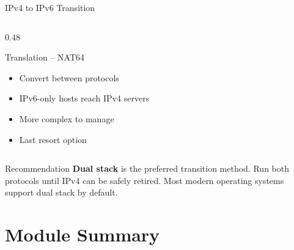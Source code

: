 \documentclass[aspectratio=169]{beamer}  %
\begin{document}
\begin{frame}[t,shrink=20]{IPv4 to IPv6 Transition}
\begin{columns}[T]
\begin{column}{0.48\textwidth}
            \vspace{0.2em}
            \begin{block}{Translation -- NAT64}
                \begin{itemize}
                    \scriptsize
                    \item Convert between protocols
                    \item IPv6-only hosts reach IPv4 servers
                    \item More complex to manage
                    \item Last resort option
                \end{itemize}
            \end{block}
        \end{column}
    \end{columns}
    
    \begin{exampleblock}{Recommendation}
        \scriptsize
        \textbf{Dual stack} is the preferred transition method. Run both protocols until IPv4 can be safely retired. Most modern operating systems support dual stack by default.
    \end{exampleblock}
\end{frame}

\section*{Module Summary}
\end{document}
